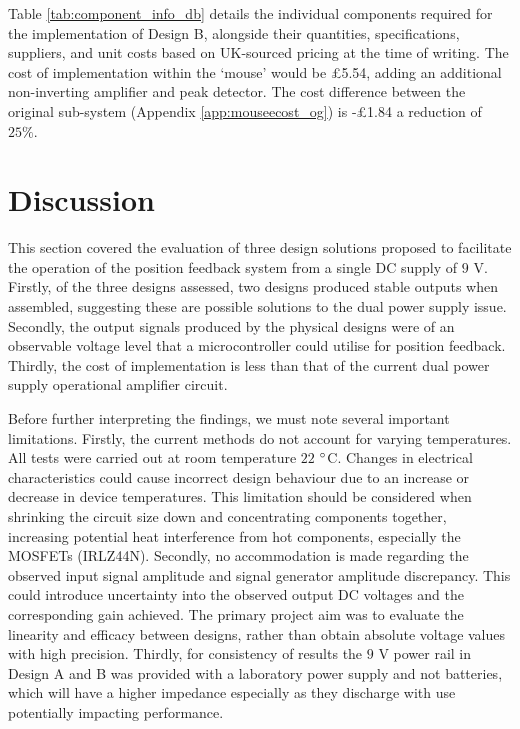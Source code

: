 Table \ref{tab:component_info_db} details the individual components required for the implementation of Design B, alongside their quantities, specifications, suppliers, and unit costs based on UK-sourced pricing at the time of writing. The cost of implementation within the `mouse' would be £5.54, adding an additional non-inverting amplifier and peak detector. The cost difference between the original sub-system (Appendix \ref{app:mouseecost_og}) is -£1.84 a reduction of \(25\%\). 

\section{Discussion}
This section covered the evaluation of three design solutions proposed to facilitate the operation of the position feedback system from a single DC supply of \(9\) V. Firstly, of the three designs assessed, two designs produced stable outputs when assembled, suggesting these are possible solutions to the dual power supply issue. Secondly, the output signals produced by the physical designs were of an observable voltage level that a microcontroller could utilise for position feedback. Thirdly, the cost of implementation is less than that of the current dual power supply operational amplifier circuit.

Before further interpreting the findings, we must note several important limitations. Firstly, the current methods do not account for varying temperatures. All tests were carried out at room temperature \(22\) \(\degree\)C. Changes in electrical characteristics could cause incorrect design behaviour due to an increase or decrease in device temperatures. This limitation should be considered when shrinking the circuit size down and concentrating components together, increasing potential heat interference from hot components, especially the MOSFETs (IRLZ44N). Secondly, no accommodation is made regarding the observed input signal amplitude and signal generator amplitude discrepancy. This could introduce uncertainty into the observed output DC voltages and the corresponding gain achieved. The primary project aim was to evaluate the linearity and efficacy between designs, rather than obtain absolute voltage values with high precision.  Thirdly, for consistency of results the \(9\) V power rail in Design A and B was provided with a laboratory power supply and not batteries, which will have a higher impedance especially as they discharge with use potentially impacting performance.

